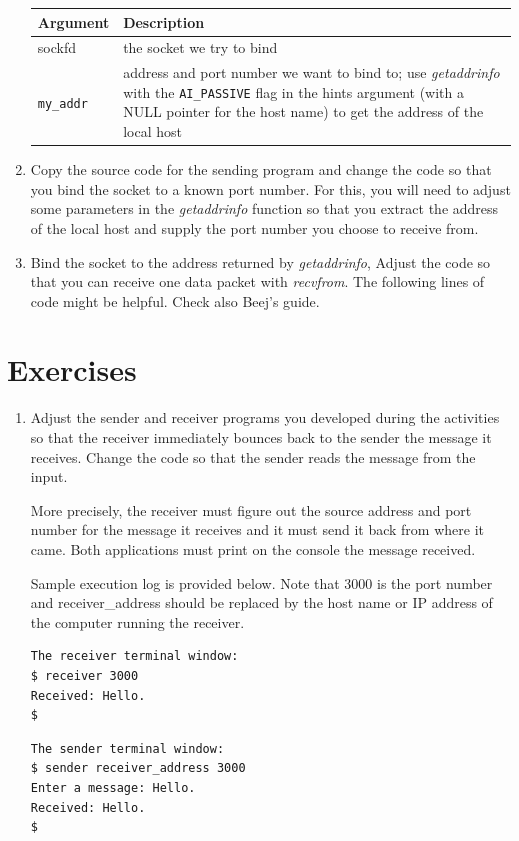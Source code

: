 \documentclass[12pt]{book}
\begin{document}
\begin{enumerate}[resume*]
  \begin{tabular}{l p{10cm}}
    \toprule
    Argument & Description \\ \midrule
    sockfd & the socket we try to bind \\
    \verb$my_addr$ & address and port number we want to bind to; use \emph{getaddrinfo} with the \verb$AI_PASSIVE$ flag in the hints argument (with a NULL pointer for the host name) to get the address of the local host \\
    \bottomrule
  \end{tabular}

\item Copy the source code for the sending program and change the code so that you bind the socket to a known port number. For this, you will need to adjust some parameters in the \emph{getaddrinfo} function so that you extract the address of the local host and supply the port number you choose to receive from.

\item Bind the socket to the address returned by \emph{getaddrinfo}, Adjust the code so that you can receive one data packet with \emph{recvfrom}. The following lines of code might be helpful. Check also Beej's guide.

  

\end{enumerate}

  

\section{Exercises}

\begin{enumerate}[label=\arabic*.]
\item Adjust the sender and receiver programs you developed during the activities so that the receiver immediately bounces back to the sender the message it receives. Change the code so that the sender reads the message from the input.

  More precisely, the receiver must figure out the source address and port number for the message it receives and it must send it back from where it came. Both applications must print on the console the message received.

  Sample execution log is provided below. Note that 3000 is the port number and receiver\_address should be replaced by the host name or IP address of the computer running the receiver.

\begin{verbatim}
The receiver terminal window:
$ receiver 3000
Received: Hello.
$
\end{verbatim}

\begin{verbatim}
The sender terminal window:
$ sender receiver_address 3000
Enter a message: Hello.
Received: Hello.
$
\end{verbatim}

\end{enumerate}


 
\end{document}
